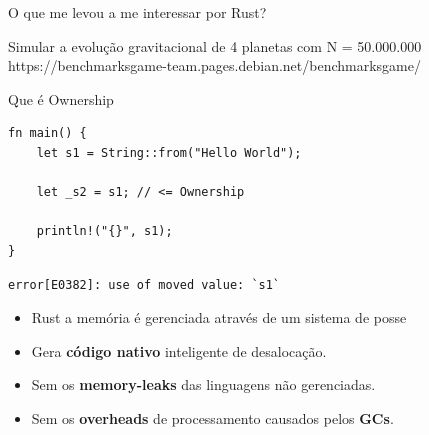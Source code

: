 \begin{frame}[fragile]{O que me levou a me interessar por Rust?}
\begin{center}
\small{Simular a evolução gravitacional de 4 planetas com N = 50.000.000}
\small{https://benchmarksgame-team.pages.debian.net/benchmarksgame/}
\end{center}
\end{frame}

\begin{frame}[fragile]{Que é Ownership}
\lstset{language=Rust, style=boxed}
\begin{lstlisting}
fn main() {
    let s1 = String::from("Hello World");

    let _s2 = s1; // <= Ownership

    println!("{}", s1);
}
\end{lstlisting}

\begin{lstlisting}
error[E0382]: use of moved value: `s1`
\end{lstlisting}
\begin{itemize}  
\item Rust a memória é gerenciada através de um sistema de posse
\item Gera  \textbf{código nativo} inteligente de desalocação.
\item Sem os \textbf{memory-leaks} das linguagens não gerenciadas. 
\item Sem os \textbf{overheads} de processamento causados pelos  \textbf{GCs}. 
\end{itemize}
\end{frame}

